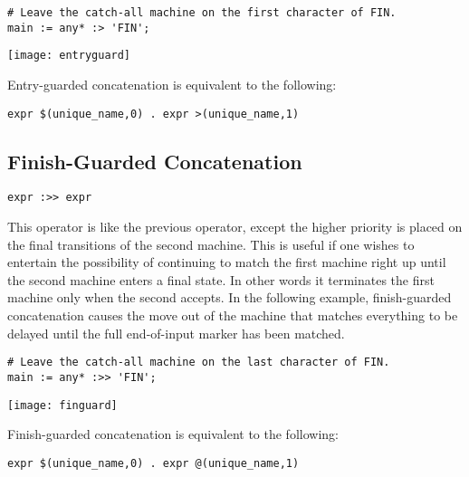 \documentclass[letterpaper,11pt,oneside]{book}
\newcommand{\verbspace}{\vspace{10pt}}
\newcommand{\graphspace}{\vspace{10pt}}
\newenvironment{inline_code}{\def\baselinestretch{1}\vspace{12pt}\small}{}
\begin{document}
\begin{inline_code}
\begin{verbatim}
# Leave the catch-all machine on the first character of FIN.
main := any* :> 'FIN';
\end{verbatim}
\end{inline_code}

\begin{center}
\texttt{[image: entryguard]}
\end{center}
\graphspace

Entry-guarded concatenation is equivalent to the following:

\verbspace
\begin{verbatim}
expr $(unique_name,0) . expr >(unique_name,1)
\end{verbatim}

\subsection{Finish-Guarded Concatenation}

\verb|expr :>> expr|
\verbspace

This operator is
like the previous operator, except the higher priority is placed on the final
transitions of the second machine. This is useful if one wishes to entertain
the possibility of continuing to match the first machine right up until the
second machine enters a final state. In other words it terminates the first
machine only when the second accepts. In the following example, finish-guarded
concatenation causes the move out of the machine that matches everything to be
delayed until the full end-of-input marker has been matched.

\begin{inline_code}
\begin{verbatim}
# Leave the catch-all machine on the last character of FIN.
main := any* :>> 'FIN';
\end{verbatim}
\end{inline_code}

\begin{center}
\texttt{[image: finguard]}
\end{center}
\graphspace

Finish-guarded concatenation is equivalent to the following:

\verbspace
\begin{verbatim}
expr $(unique_name,0) . expr @(unique_name,1)
\end{verbatim}
\end{document}
